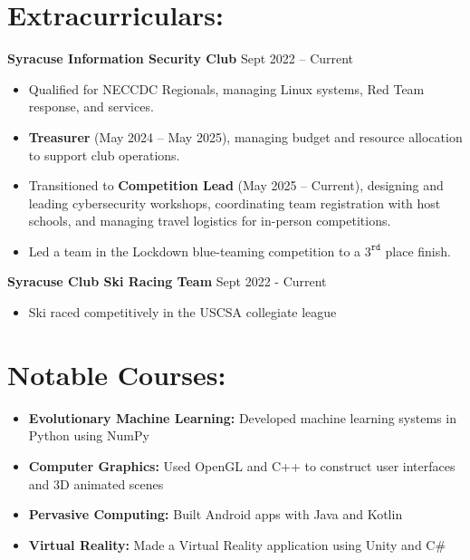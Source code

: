 \section*{Extracurriculars:}
\textbf{Syracuse Information Security Club} \hfill Sept 2022 – Current \\
\vspace{-9pt}
\begin{itemize}
	\item Qualified for NECCDC Regionals, managing Linux systems, Red Team response, and services.  
	\item \textbf{Treasurer} (May 2024 – May 2025), managing budget and resource allocation to support club operations.  
	\item Transitioned to \textbf{Competition Lead} (May 2025 – Current), designing and leading cybersecurity workshops, coordinating team registration with host schools, and managing travel logistics for in-person competitions.  
	\item Led a team in the Lockdown blue-teaming competition to a $3^{\texttt{rd}}$ place finish.  
\end{itemize}

\vspace{-7pt}

\textbf{Syracuse Club Ski Racing Team} \hfill Sept 2022 - Current\\
\vspace{-9pt}
\begin{itemize}
	\item Ski raced competitively in the USCSA collegiate league
\end{itemize}
\vspace{-25pt}
	\section*{Notable Courses:}
\begin{itemize}
	\item \textbf{Evolutionary Machine Learning:} Developed machine learning systems in Python using NumPy
	\item \textbf{Computer Graphics:} Used OpenGL and C++ to construct user interfaces and 3D animated scenes
	\item \textbf{Pervasive Computing:} Built Android apps with Java and Kotlin
	\item \textbf{Virtual Reality:} Made a Virtual Reality application using Unity and C\#
\end{itemize}





\vspace{-18.5pt}


